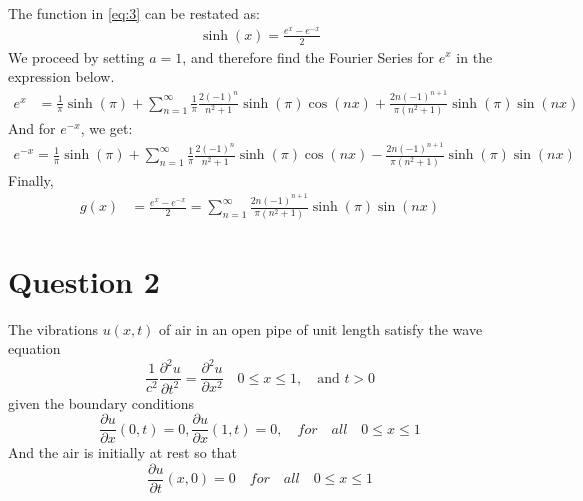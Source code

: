 \documentclass[12pt,a4paper]{article}
\begin{document}
\begin{enumerate}
The function in \eqref{eq:3}  can be restated as:\\
\begin{align*}
	\sinh(x)=\frac{e^{x}-e^{-x}}{2}
\end{align*}
We proceed by setting $a = 1$,  and therefore find the Fourier Series for $e^x$ in the expression below.\\
\begin{align*}
	e^x &=\frac{1}{\pi}\sinh(\pi)+\sum_{n=1}^{\infty}\frac{1}{\pi}\frac{2(-1)^{n}}{n^{2}+1 }\sinh(\pi)\cos(nx) + \frac{2n(-1)^{n+1}}{\pi(n^2+1)}\sinh(\pi)\sin(nx)
\end{align*}
And for $e^{-x}$,  we get:\\
\begin{align*}
e^{-x}=\frac{1}{\pi}\sinh(\pi)+\sum_{n=1}^{\infty}\frac{1}{\pi}\frac{2(-1)^{n}}{n^{2}+1 }\sinh(\pi)\cos(nx)- \frac{2n(-1)^{n+1}}{\pi(n^2+1)}\sinh(\pi)\sin(nx)
\end{align*}
Finally,
\begin{align*}
g(x) &=\frac{e^{x}-e^{-x}}{2}=\sum_{n=1}^{\infty}\frac{2n(-1)^{n+1}}{\pi(n^2+1)}\sinh(\pi)\sin(nx)
\end{align*}
\end{enumerate}

\section*{Question 2}
The vibrations $u(x, t)$ of air in an open pipe of unit length satisfy the wave equation 
\begin{equation}
\label{eqn3}
	\frac{1}{c^2} \frac{\partial^2 u}{\partial t^2}  	= \frac{\partial^2 u}{\partial x^2}  \quad 0\le x \le1,\quad \text{and } t>0
\end{equation}
given the boundary conditions
\begin{equation}
\label{equ4}
		\frac{\partial u}{\partial x}(0,t)=0,\frac{\partial u}{\partial x}(1,t)=0,\quad for\quad all \quad 		0\le x \le1
\end{equation}
And the air is initially at rest so that
\begin{equation}
\label{eqn5}
\frac{\partial u}{\partial t}(x,0)=0 \quad for\quad all \quad 0\le x \le1
\end{equation}
\end{document}
